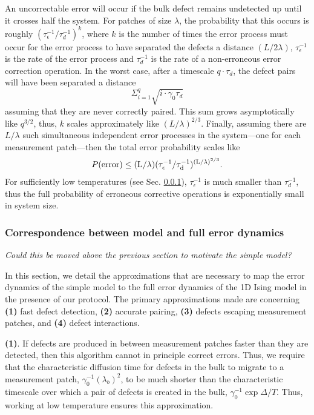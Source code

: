 \documentclass[twocolumn,superscriptaddress,aps,prb,floatfix]{revtex4-1}
\newcommand{\CMH}[1]{{\color{green} { #1}}}
\begin{document}
 An uncorrectable error will occur if the bulk defect remains undetected up until it crosses half the system.  For patches of size $\lambda$, the probability that this occurs is roughly $(\tau_{\epsilon}^{-1} / \tau_d^{-1})^{k}$, where $k$ is the number of times the error process must occur for the error process to have separated the defects a distance $(L/2\lambda)$, $\tau_{\epsilon}^{-1}$ is the rate of the error process and $\tau_d^{-1}$ is the rate of a non-erroneous error correction operation.  In the worst case, after a timescale $q\cdot\tau_{d}$, the defect pairs will have been separated a distance 
\begin{equation}  
\Sigma^q_{i=1} \sqrt{i \cdot \gamma_0 \tau_{d}}
\end{equation}
 assuming that they are never correctly paired.  This sum grows asymptotically like $q^{3/2}$, thus, $k$ scales approximately like $(L/\lambda)^{2/3}$.
Finally, assuming there are $L/\lambda$ such simultaneous independent error processes in the system---one for each measurement patch---then the total error probability scales like
\begin{align}
\label{eq:err_scaling}
 P(\rm{error})\leq (L/\lambda) (\tau_{\epsilon}^{-1} / \tau_d^{-1})^{(L/\lambda)^{2/3}}.
\end{align}
For sufficiently low temperatures (see Sec. \ref{sec:correspondence}), $\tau_{\epsilon}^{-1}$ is much smaller than $\tau_d^{-1}$, thus the full probability of erroneous corrective operations is exponentially small in system size.

 \subsubsection{Correspondence between model and full error dynamics}
 \label{sec:correspondence}
 
 \CMH{\it{Could this be moved above the previous section to motivate the simple model?}}
 
 In this section, we detail the approximations that are necessary to map the error dynamics of the simple model to the full error dynamics of the 1D Ising model in the presence of our protocol.  The primary approximations made are concerning \textbf{(1)} fast defect detection, \textbf{(2)} accurate pairing, \textbf{(3)} defects escaping measurement patches, and \textbf{(4)} defect interactions.
 
 \textbf{(1)}. If defects are produced in between measurement patches faster than they are detected, then this algorithm cannot in principle correct errors.  Thus, we require that the characteristic diffusion time for defects in the bulk to migrate to a measurement patch, $\gamma_0^{-1}(\lambda_b)^2$, to be much shorter than the characteristic timescale over which a pair of defects is created in the bulk, $\gamma_0^{-1} \exp{\Delta/T}$.  Thus, working at low temperature ensures this approximation.
 
\end{document}
